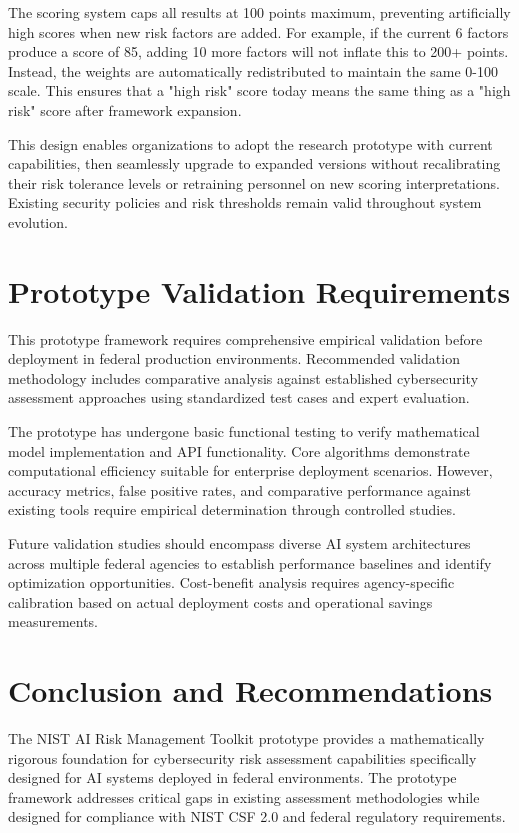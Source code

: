 \documentclass[11pt,letterpaper]{article}
\begin{document}
The scoring system caps all results at 100 points maximum, preventing artificially high scores when new risk factors are added. For example, if the current 6 factors produce a score of 85, adding 10 more factors will not inflate this to 200+ points. Instead, the weights are automatically redistributed to maintain the same 0-100 scale. This ensures that a "high risk" score today means the same thing as a "high risk" score after framework expansion.

This design enables organizations to adopt the research prototype with current capabilities, then seamlessly upgrade to expanded versions without recalibrating their risk tolerance levels or retraining personnel on new scoring interpretations. Existing security policies and risk thresholds remain valid throughout system evolution.

\section{Prototype Validation Requirements}

This prototype framework requires comprehensive empirical validation before deployment in federal production environments. Recommended validation methodology includes comparative analysis against established cybersecurity assessment approaches using standardized test cases and expert evaluation.

The prototype has undergone basic functional testing to verify mathematical model implementation and API functionality. Core algorithms demonstrate computational efficiency suitable for enterprise deployment scenarios. However, accuracy metrics, false positive rates, and comparative performance against existing tools require empirical determination through controlled studies.

Future validation studies should encompass diverse AI system architectures across multiple federal agencies to establish performance baselines and identify optimization opportunities. Cost-benefit analysis requires agency-specific calibration based on actual deployment costs and operational savings measurements.

\section{Conclusion and Recommendations}

The NIST AI Risk Management Toolkit prototype provides a mathematically rigorous foundation for cybersecurity risk assessment capabilities specifically designed for AI systems deployed in federal environments. The prototype framework addresses critical gaps in existing assessment methodologies while designed for compliance with NIST CSF 2.0 and federal regulatory requirements.
\end{document}
